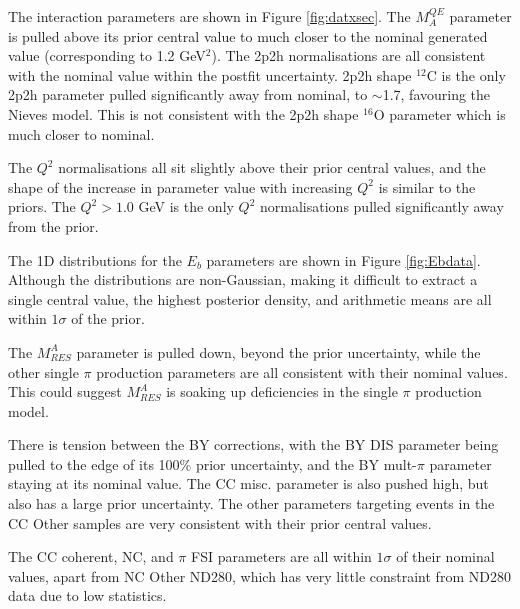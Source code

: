The interaction parameters are shown in Figure \ref{fig:datxsec}. The $M^{QE}_A$ parameter is pulled above its prior central value to much closer to the nominal generated value (corresponding to 1.2 GeV$^2$). The 2p2h normalisations are all consistent with the nominal value within the postfit uncertainty. 2p2h shape $^{12}$C is the only 2p2h parameter pulled significantly away from nominal, to $\sim$1.7, favouring the Nieves model. This is not consistent with the 2p2h shape $^{16}$O parameter which is much closer to nominal.

The $Q^2$ normalisations all sit slightly above their prior central values, and the shape of the increase in parameter value with increasing $Q^2$ is similar to the priors. The $Q^2>1.0$ GeV is the only $Q^2$ normalisations pulled significantly away from the prior.

The 1D distributions for the $E_b$ parameters are shown in Figure \ref{fig:Ebdata}. Although the distributions are non-Gaussian, making it difficult to extract a single central value, the highest posterior density, and arithmetic means are all within $1\sigma$ of the prior.

The $M^A_{RES}$ parameter is pulled down, beyond the prior uncertainty, while the other single $\pi$ production parameters are all consistent with their nominal values. This could suggest $M^A_{RES}$ is soaking up deficiencies in the single $\pi$ production model.

There is tension between the BY corrections, with the BY DIS parameter being pulled to the edge of its 100$\%$ prior uncertainty, and the BY mult-$\pi$ parameter staying at its nominal value. The CC misc. parameter is also pushed high, but also has a large prior uncertainty. The other parameters targeting events in the CC Other samples are very consistent with their prior central values. 

The CC coherent, NC, and $\pi$ FSI parameters are all within $1\sigma$ of their nominal values, apart from NC Other ND280, which has very little constraint from ND280 data due to low statistics. 

